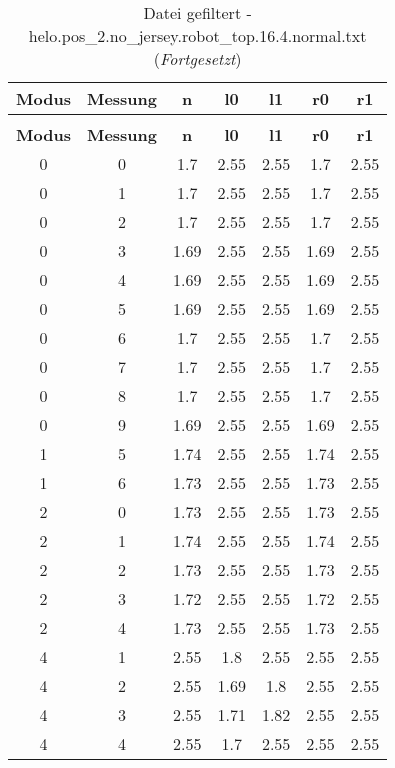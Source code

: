 \clearpage{}
\begin{longtable}{|c|c||c||c|c||c|c|}
	\caption{Datei gefiltert - helo.pos\_2.no\_jersey.robot\_top.16.4.normal.txt} \label{tab:helo.pos-2.no-jersey.robot-top.16.4.normal.txt} \\ \hline
	\textbf{Modus} & \textbf{Messung} & \textbf{n} & \textbf{l0} & \textbf{l1} & \textbf{r0} & \textbf{r1}\\ \hline
	\endfirsthead
	\caption[]{Datei gefiltert - helo.pos\_2.no\_jersey.robot\_top.16.4.normal.txt (\emph{Fortgesetzt})} \\ \hline
	\textbf{Modus} & \textbf{Messung} & \textbf{n} & \textbf{l0} & \textbf{l1} & \textbf{r0} & \textbf{r1}\\ \hline
	\endhead
	0 & 0 & 1.7 & 2.55 & 2.55 & 1.7 & 2.55 \\ \hline
	0 & 1 & 1.7 & 2.55 & 2.55 & 1.7 & 2.55 \\ \hline
	0 & 2 & 1.7 & 2.55 & 2.55 & 1.7 & 2.55 \\ \hline
	0 & 3 & 1.69 & 2.55 & 2.55 & 1.69 & 2.55 \\ \hline
	0 & 4 & 1.69 & 2.55 & 2.55 & 1.69 & 2.55 \\ \hline
	0 & 5 & 1.69 & 2.55 & 2.55 & 1.69 & 2.55 \\ \hline
	0 & 6 & 1.7 & 2.55 & 2.55 & 1.7 & 2.55 \\ \hline
	0 & 7 & 1.7 & 2.55 & 2.55 & 1.7 & 2.55 \\ \hline
	0 & 8 & 1.7 & 2.55 & 2.55 & 1.7 & 2.55 \\ \hline
	0 & 9 & 1.69 & 2.55 & 2.55 & 1.69 & 2.55 \\ \hline
	1 & 5 & 1.74 & 2.55 & 2.55 & 1.74 & 2.55 \\ \hline
	1 & 6 & 1.73 & 2.55 & 2.55 & 1.73 & 2.55 \\ \hline
	2 & 0 & 1.73 & 2.55 & 2.55 & 1.73 & 2.55 \\ \hline
	2 & 1 & 1.74 & 2.55 & 2.55 & 1.74 & 2.55 \\ \hline
	2 & 2 & 1.73 & 2.55 & 2.55 & 1.73 & 2.55 \\ \hline
	2 & 3 & 1.72 & 2.55 & 2.55 & 1.72 & 2.55 \\ \hline
	2 & 4 & 1.73 & 2.55 & 2.55 & 1.73 & 2.55 \\ \hline
	4 & 1 & 2.55 & 1.8 & 2.55 & 2.55 & 2.55 \\ \hline
	4 & 2 & 2.55 & 1.69 & 1.8 & 2.55 & 2.55 \\ \hline
	4 & 3 & 2.55 & 1.71 & 1.82 & 2.55 & 2.55 \\ \hline
	4 & 4 & 2.55 & 1.7 & 2.55 & 2.55 & 2.55 \\ \hline

\end{longtable}
